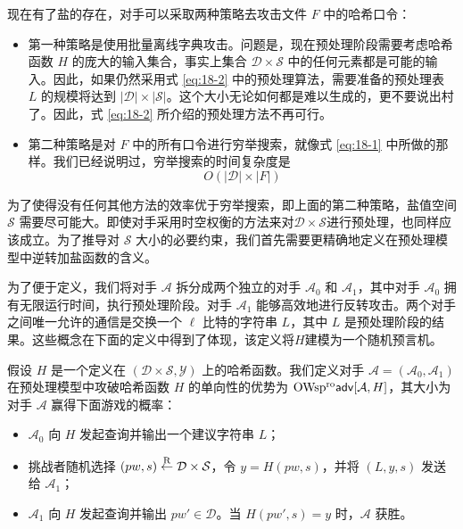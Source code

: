 现在有了盐的存在，对手可以采取两种策略去攻击文件 $F$ 中的哈希口令：

\begin{itemize}
	\item 第一种策略是使用批量离线字典攻击。问题是，现在预处理阶段需要考虑哈希函数 $H$ 的庞大的输入集合，事实上集合 $\mathcal{D}\times\mathcal{S}$ 中的任何元素都是可能的输入。因此，如果仍然采用式 \ref{eq:18-2} 中的预处理算法，需要准备的预处理表 $L$ 的规模将达到 $|\mathcal{D}|\times|\mathcal{S}|$。这个大小无论如何都是难以生成的，更不要说出村了。因此，式 \ref{eq:18-2} 所介绍的预处理方法不再可行。
	\item 第二种策略是对 $F$ 中的所有口令进行穷举搜索，就像式 \ref{eq:18-1} 中所做的那样。我们已经说明过，穷举搜索的时间复杂度是
	$$O(|\mathcal{D}|\times |F|)$$
\end{itemize}

为了使得没有任何其他方法的效率优于穷举搜索，即上面的第二种策略，盐值空间 $\mathcal{S}$ 需要尽可能大。即使对手采用时空权衡的方法来对$\mathcal{D}\times\mathcal{S}$进行预处理，也同样应该成立。为了推导对 $\mathcal{S}$ 大小的必要约束，我们首先需要更精确地定义在预处理模型中逆转加盐函数的含义。

\begin{snote}[带有预处理的加盐单向函数.]
为了便于定义，我们将对手 $\mathcal{A}$ 拆分成两个独立的对手 $\mathcal{A}_0$ 和 $\mathcal{A}_1$，其中对手 $\mathcal{A}_0$ 拥有无限运行时间，执行预处理阶段。对手 $\mathcal{A}_1$ 能够高效地进行反转攻击。两个对手之间唯一允许的通信是交换一个 $\ell$ 比特的字符串 $L$，其中 $L$ 是预处理阶段的结果。这些概念在下面的定义中得到了体现，该定义将$H$建模为一个随机预言机。
\end{snote}

\begin{definition}\label{def:18-3}
	假设 $H$ 是一个定义在 $(\mathcal{D}\times\mathcal{S},\mathcal{Y})$ 上的哈希函数。我们定义对手 $\mathcal{A}=(\mathcal{A}_0,\mathcal{A}_1)$ 在预处理模型中攻破哈希函数 $H$ 的单向性的优势为 ${\rm OWsp^{ro}\mathsf{adv}}[\mathcal{A},H]$，其大小为对手 $\mathcal{A}$ 赢得下面游戏的概率：
	\begin{itemize}
		\item $\mathcal{A}_0$ 向 $H$ 发起查询并输出一个建议字符串 $L$；
		\item 挑战者随机选择 $(pw,s)\overset{\rm R}\leftarrow\mathcal{D}\times\mathcal{S}$，令 $y=H(pw,s)$，并将 $(L,y,s)$ 发送给 $\mathcal{A}_1$；
		\item $\mathcal{A}_1$ 向 $H$ 发起查询并输出 $pw'\in\mathcal{D}$。当 $H(pw',s)=y$ 时，$\mathcal{A}$ 获胜。
	\end{itemize}
\end{definition}

